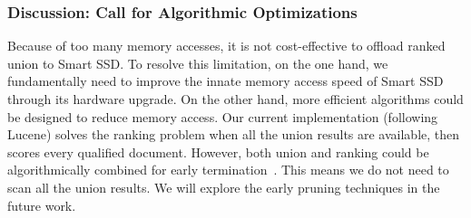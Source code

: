 \subsubsection{Discussion: Call for Algorithmic Optimizations}\label{sec:rankUnionOpt}
Because of too many memory accesses, it is not cost-effective to offload ranked union to Smart SSD.
To resolve this limitation, on the one hand, we fundamentally need to improve the innate memory access speed of Smart SSD through its hardware upgrade. On the other hand, more efficient algorithms could be designed to reduce memory access. Our current implementation (following Lucene) solves the ranking problem when all the union results are available, then scores every qualified document. However, both union and ranking could be algorithmically combined for early termination~\cite{Broder2003EQE,Fagin2001}. This means we do not need to scan all the union results. We will explore the early pruning techniques in the future work.







